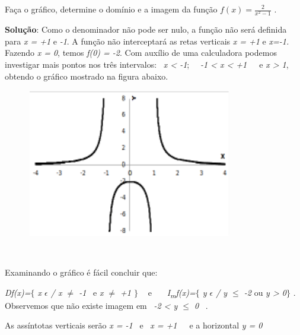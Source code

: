 \begin{texemplo}
Faça o gráfico, determine o domínio e a imagem da função  \( f \left( x \right) =\frac{2}{x^{2}-1} \) .

\textbf{Solução}: Como o denominador não pode ser nulo, a função não será definida para \textit{x = +1 }e\textit{ -1}.  A função não interceptará as retas verticais \textit{x = +1 }e\textit{ x=-1. }Fazendo \textit{x = 0}, temos \textit{f(0) = -2}. Com auxílio de uma calculadora podemos investigar mais pontos nos três intervalos:~ \textit{x < -1};~~ \textit{-1 < x < +1}~~~e  \textit{x > 1}, obtendo o gráfico mostrado na figura abaixo. 

\begin{figure}[H]
	\begin{Center}
		\includegraphics[width=3.55in,height=2.55in]{capitulos/outras_funcoes/media/image12.pdf}
	\end{Center}
\end{figure}

~~

\quad Examinando o gráfico é fácil concluir que: 

\quad \textit{Df(x)=$ \{ $  x $ \epsilon $  \textbf{ }/ x $ \neq $  -1} ~e  \textit{x $ \neq $  +1\textbf{ }$ \} $ ~ } e~~~  \textit{I\textsubscript{m}f(x)=$ \{ $ y $ \epsilon $   / y $ \leq $  -2 }ou\textit{ y > 0$ \} $ }. Observemos que não existe imagem em~ \textit{-2 < y $ \leq $  0}~ .

\quad As assíntotas verticais serão \textit{x = -1}~ e~ \textit{x = +1}~~~e a horizontal  \textit{y = 0} \textit{ }\qedsymbol{} 
\end{texemplo}

